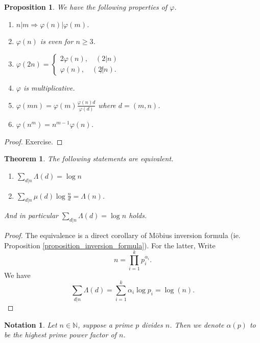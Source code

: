 \documentclass{article}
\newtheorem{theorem}{Theorem} [section]
\newtheorem{proposition}{Proposition}[section]
\newtheorem{notation}{Notation}[section]
\newcommand{\N}[0]{\mathbb{N}}
\begin{document}
\begin{proposition}We have the following properties of $\varphi$.
  \begin{enumerate}[1).]
    \item $n|m\Rightarrow\varphi(n)|\varphi(m)$.
    \item $\varphi(n)$ is even for $n\geq 3$.
    \item $\varphi(2n) = \begin{cases}
      2\varphi(n),\quad (2|n)\\
      \varphi(n),\quad (2\not|n).
    \end{cases}$
    \item $\varphi$ is multiplicative.
    \item $\varphi(mn) = \varphi(m){\frac {\varphi(n)d}{\varphi(d)}}$ where $d=(m,n)$.
    \item $\varphi(n^m) = n^{m-1}\varphi(n)$.
  \end{enumerate}
\end{proposition}

\begin{proof}
  Exercise.
\end{proof}

\begin{theorem}The following statements are equivalent.
  \begin{enumerate}[1).]
    \item $\sum_{d|n}\Lambda(d) = \log n $
    \item $\sum_{d|n}\mu(d)\log {\frac n d} = \Lambda(n)$.
  \end{enumerate}
  And in particular $\sum_{d|n}\Lambda(d) = \log n $ holds.
  \label{theorem_von_mangoldot_sum}
\end{theorem}

\begin{proof}
  The equivalence is a direct corollary of Möbius inversion formula (ie. Proposition \ref{proposition_inversion_formula}). For the latter, Write 
  \begin{equation*}
    n = \prod_{i=1}^k p_i^{\alpha_i}.
  \end{equation*}
  We have 
  \begin{equation*}
    \sum_{d|n} \Lambda(d) = \sum_{i=1}^k \alpha_i\log p_i = \log(n).
  \end{equation*}
\end{proof}

\begin{notation}
  Let $n\in\N$, suppose a prime $p$ divides $n$. Then we denote $\alpha(p)$ to be the highest prime power factor of $n$.
\end{notation}
\end{document}

